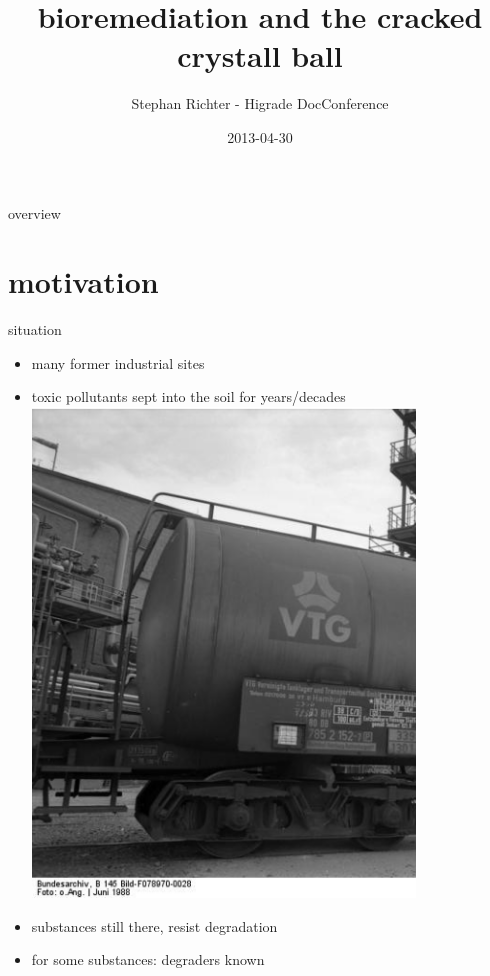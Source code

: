 \documentclass[style=ufz]{powerdot}
\title{bioremediation and the cracked crystall ball}
\author{Stephan Richter - Higrade DocConference}
\date{2013-04-30}
\begin{document}
\maketitle

\begin{slide}{overview}
\tableofcontents[content=sections]
\end{slide}

\section{motivation}
\begin{slide}{situation}
\begin{itemize}
 \item many former industrial sites\pause
 \item toxic pollutants sept into the soil for years/decades
 \includegraphics[width=0.8\textwidth]{waggon.ps}\pause
 \item substances still there, resist degradation\pause
 \item for some substances: degraders known
\end{itemize}
\end{slide}
\end{document}
